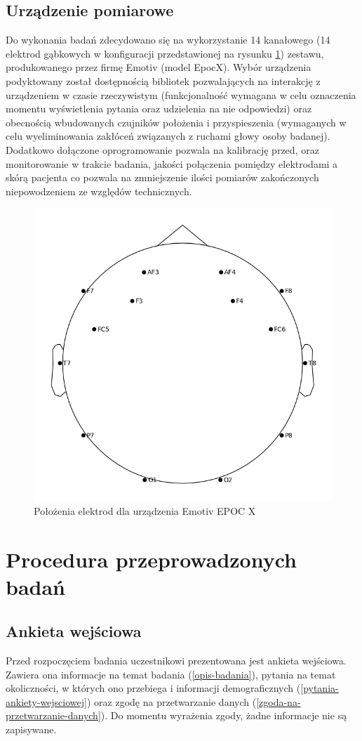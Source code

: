 \documentclass{./assets/wfis}
\begin{document}
\subsection{Urządzenie pomiarowe}\label{emotiv}
Do wykonania badań zdecydowano się na wykorzystanie 14 kanałowego (14 elektrod gąbkowych w konfiguracji przedstawionej na rysunku \ref{fig:emotiv-electrode-locations}) zestawu, produkowanego przez firmę Emotiv (model EpocX\cite{emotiv_inc_epoc_nodate}). Wybór urządzenia podyktowany został dostępnością bibliotek pozwalających na interakcję z urządzeniem w czasie rzeczywistym\cite{emotiv_inc_emotiv_nodate-1} (funkcjonalność wymagana w celu oznaczenia momentu wyświetlenia pytania oraz udzielenia na nie odpowiedzi) oraz obecnością wbudowanych czujników położenia i przyspieszenia (wymaganych w celu wyeliminowania zakłóceń związanych z ruchami głowy osoby badanej). Dodatkowo dołączone oprogramowanie pozwala na kalibrację przed, oraz monitorowanie w trakcie badania, jakości połączenia pomiędzy elektrodami a skórą pacjenta co pozwala na zmniejszenie ilości pomiarów zakończonych niepowodzeniem ze względów technicznych.

\begin{figure}[h!]
    \centering
    \includegraphics[width=0.5\columnwidth]{thesis/emotiv_electrode_locations.png}
    \caption{Położenia elektrod dla urządzenia Emotiv EPOC X}
    \label{fig:emotiv-electrode-locations}
\end{figure}


\section{Procedura przeprowadzonych badań}\label{procedura-badan}
\subsection{Ankieta wejściowa}
Przed rozpoczęciem badania uczestnikowi prezentowana jest ankieta wejściowa. Zawiera ona informacje na temat badania (\autoref{opis-badania}), pytania na temat okoliczności, w których ono przebiega i informacji demograficznych (\autoref{pytania-ankiety-wejsciowej}) oraz zgodę na przetwarzanie danych (\autoref{zgoda-na-przetwarzanie-danych}). Do momentu wyrażenia zgody, żadne informacje nie są zapisywane.
\end{document}
